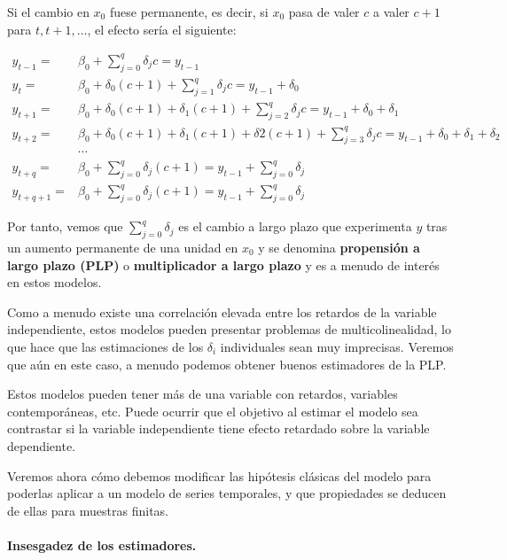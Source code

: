 Si el cambio en $x_0$ fuese permanente, es decir, si $x_0$ pasa de valer $c$ a valer $c+1$ para $t, t+1, \ldots$, el efecto ser\'ia el siguiente:

\begin{align*}
 y_{t-1}=&\beta_0+\sum_{j=0}^{q}\delta_jc = y_{t-1} \\
 y_{t}=&\beta_0+\delta_0(c+1)+\sum_{j=1}^{q}\delta_jc = y_{t-1}+\delta_0 \\
 y_{t+1}=&\beta_0+\delta_0(c+1)+\delta_1(c+1)+\sum_{j=2}^{q}\delta_jc = y_{t-1}+\delta_0+\delta_1 \\
 y_{t+2}=&\beta_0+\delta_0(c+1)+\delta_1(c+1)+\delta2(c+1)+\sum_{j=3}^{q}\delta_jc = y_{t-1}+\delta_0+\delta_1+\delta_2 \\
 &\cdots \\
 y_{t+q}=&\beta_0+\sum_{j=0}^{q}\delta_j(c+1) = y_{t-1}+\sum_{j=0}^{q}\delta_j \\
 y_{t+q+1}=&\beta_0+\sum_{j=0}^{q}\delta_j(c+1) = y_{t-1}+\sum_{j=0}^{q}\delta_j 
\end{align*}

Por tanto, vemos que $\sum_{j=0}^{q}\delta_j$ es el cambio a largo plazo que experimenta $y$ tras un aumento permanente de una unidad en $x_0$ y se denomina \textbf{propensi\'on a largo plazo (PLP)} o \textbf{multiplicador a largo plazo} y es a menudo de inter\'es en estos modelos.

Como a menudo existe una correlaci\'on elevada entre los retardos de la variable independiente, estos modelos pueden presentar problemas de multicolinealidad, lo que hace que las estimaciones de los $\delta_i$ individuales sean muy imprecisas. Veremos que a\'un en este caso, a menudo podemos obtener buenos estimadores de la PLP.

Estos modelos pueden tener m\'as de una variable con retardos, variables contempor\'aneas, etc. Puede ocurrir que el objetivo al estimar el modelo sea contrastar si la variable independiente tiene efecto retardado sobre la variable dependiente.


Veremos ahora c\'omo debemos modificar las hip\'otesis cl\'asicas del modelo para poderlas aplicar a un modelo de series temporales, y que propiedades se deducen de ellas para muestras finitas.

\paragraph{Insesgadez de los estimadores.}

